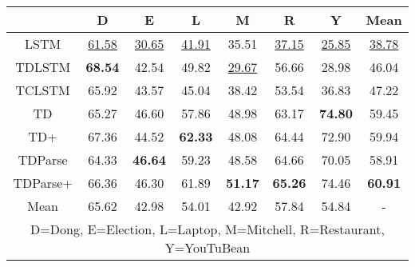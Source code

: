 \begin{tabular}{|c|c|c|c|c|c|c|c|}
  \hline
  &   D &  E &  L &  M &  R &  Y &   Mean \\
 \hline
 LSTM &  \underline{61.58} &     \underline{30.65} &   \underline{41.91} &     35.51 &       \underline{37.15} &      \underline{25.85} &  \underline{38.78} \\
 \hline
 TDLSTM &  \textbf{68.54} &     42.54 &   49.82 &     \underline{29.67} &       56.66 &      28.98 &  46.04 \\
 \hline
 TCLSTM &  65.92 &     43.57 &   45.04 &     38.42 &       53.54 &      36.83 &  47.22 \\
 \hline
 TD &  65.27 &     46.60 &   57.86 &     48.98 &       63.17 &      \textbf{74.80} &  59.45 \\
 \hline
 TD+ &  67.36 &     44.52 &   \textbf{62.33} &     48.08 &       64.44 &      72.90 &  59.94 \\
 \hline
 TDParse &  64.33 &     \textbf{46.64} &   59.23 &     48.58 &       64.66 &      70.05 &  58.91 \\
 \hline
 TDParse+ &  66.36 &     46.30 &   61.89 &     \textbf{51.17} &       \textbf{65.26} &      74.46 &  \textbf{60.91} \\
 \hline
 Mean &  65.62 &     42.98 &   54.01 &     42.92 &       57.84 &      54.84 &  - \\
 \hline
\multicolumn{8}{|p{11.5cm}|}{\centering D=Dong, E=Election, L=Laptop, M=Mitchell, R=Restaurant, Y=YouTuBean}\\
\hline
 \end{tabular}